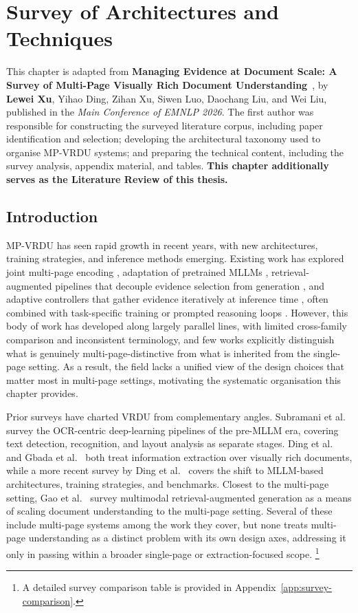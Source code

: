 \chapter{Survey of Architectures and Techniques}
\label{ch:survey}

This chapter is adapted from \textbf{Managing Evidence at Document Scale: A Survey of Multi-Page Visually Rich Document Understanding}~\cite{xu2026managing}, by \textbf{Lewei Xu}, Yihao Ding, Zihan Xu, Siwen Luo, Daochang Liu, and Wei Liu, published in the \emph{Main Conference of EMNLP 2026}. The first author was responsible for constructing the surveyed literature corpus, including paper identification and selection; developing the architectural taxonomy used to organise MP-VRDU systems; and preparing the technical content, including the survey analysis, appendix material, and tables. \textbf{This chapter additionally serves as the Literature Review of this thesis.}

\section{Introduction}
\label{section:survey_intro}
MP-VRDU has seen rapid growth in recent years, with new architectures, training strategies, and inference methods emerging. Existing work has explored joint multi-page encoding \citep{tito2023hierarchical}, adaptation of pretrained MLLMs \citep{duan2025docopilot}, retrieval-augmented pipelines that decouple evidence selection from generation \citep{cho2024m3docrag}, and adaptive controllers that gather evidence iteratively at inference time \citep{sun2025docagent}, often combined with task-specific training or prompted reasoning loops \citep{xiong2026docr1, han2025mdocagent}. However, this body of work has developed along largely parallel lines, with limited cross-family comparison and inconsistent terminology, and few works explicitly distinguish what is genuinely multi-page-distinctive from what is inherited from the single-page setting. As a result, the field lacks a unified view of the design choices that matter most in multi-page settings, motivating the systematic organisation this chapter provides.

Prior surveys have charted VRDU from complementary angles. Subramani et al.~\citep{subramani2020survey} survey the OCR-centric deep-learning pipelines of the pre-MLLM era, covering text detection, recognition, and layout analysis as separate stages. Ding et al.~\citep{ding2026deep} and Gbada et al.~\citep{gbada2025deep} both treat information extraction over visually rich documents, while a more recent survey by Ding et al.~\citep{ding2026survey} covers the shift to MLLM-based architectures, training strategies, and benchmarks. Closest to the multi-page setting, Gao et al.~\citep{gao2026scaling} survey multimodal retrieval-augmented generation as a means of scaling document understanding to the multi-page setting. Several of these include multi-page systems among the work they cover, but none treats multi-page understanding as a distinct problem with its own design axes, addressing it only in passing within a broader single-page or extraction-focused scope.
\footnote{A detailed survey comparison table is provided in Appendix~\ref{app:survey-comparison}.}

